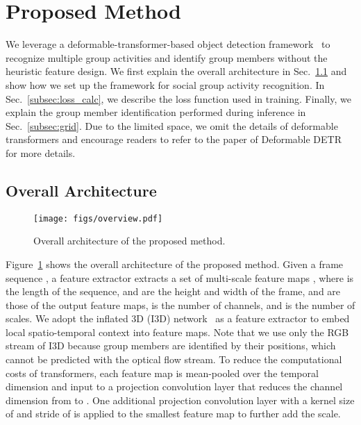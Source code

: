 \documentclass[runningheads]{llncs}
\begin{document}
\section{Proposed Method}
We leverage a deformable-transformer-based object detection framework~\cite{zhu_iclr2021} to recognize multiple group activities and identify group members without the heuristic feature design.
We first explain the overall architecture in Sec.~\ref{subsec:overall} and show how we set up the framework for social group activity recognition.
In Sec.~\ref{subsec:loss_calc}, we describe the loss function used in training.
Finally, we explain the group member identification performed during inference in Sec.~\ref{subsec:grid}. Due to the limited space, we omit the details of deformable transformers and encourage readers to refer to the paper of Deformable DETR~\cite{zhu_iclr2021} for more details.

\subsection{Overall Architecture}\label{subsec:overall}

\begin{figure}[t]
 \centering
 \texttt{[image: figs/overview.pdf]}
 \caption{Overall architecture of the proposed method.}\label{fig:overview}
 \vspace{-1.0ex}
\end{figure}

Figure~\ref{fig:overview} shows the overall architecture of the proposed method.
Given a frame sequence , a feature extractor extracts a set of multi-scale feature maps , where  is the length of the sequence,  and  are the height and width of the frame,  and  are those of the output feature maps,  is the number of channels, and  is the number of scales. We adopt the inflated 3D (I3D) network~\cite{carreira_cvpr2017} as a feature extractor to embed local spatio-temporal context into feature maps. Note that we use only the RGB stream of I3D because group members are identified by their positions, which cannot be predicted with the optical flow stream. To reduce the computational costs of transformers, each feature map  is mean-pooled over the temporal dimension and input to a projection convolution layer that reduces the channel dimension from  to . One additional projection convolution layer with a kernel size of  and stride of  is applied to the smallest feature map to further add the scale.
\end{document}
